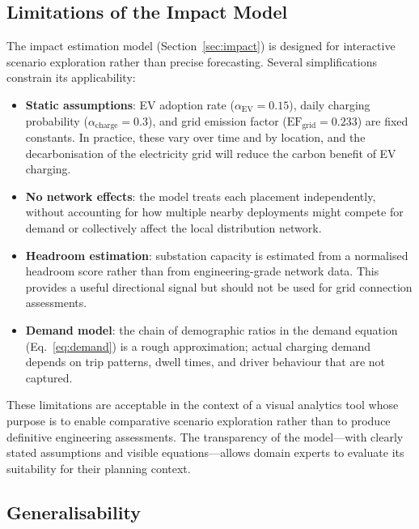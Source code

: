 \subsection{Limitations of the Impact Model}
\label{sec:disc-limitations}

The impact estimation model (Section~\ref{sec:impact}) is designed for interactive scenario exploration rather than precise forecasting. Several simplifications constrain its applicability:

\begin{itemize}[nosep]
    \item \textbf{Static assumptions}: EV adoption rate ($\alpha_{\text{EV}} = 0.15$), daily charging probability ($\alpha_{\text{charge}} = 0.3$), and grid emission factor ($\text{EF}_{\text{grid}} = 0.233$) are fixed constants. In practice, these vary over time and by location, and the decarbonisation of the electricity grid will reduce the carbon benefit of EV charging.
    \item \textbf{No network effects}: the model treats each placement independently, without accounting for how multiple nearby deployments might compete for demand or collectively affect the local distribution network.
    \item \textbf{Headroom estimation}: substation capacity is estimated from a normalised headroom score rather than from engineering-grade network data. This provides a useful directional signal but should not be used for grid connection assessments.
    \item \textbf{Demand model}: the chain of demographic ratios in the demand equation (Eq.~\ref{eq:demand}) is a rough approximation; actual charging demand depends on trip patterns, dwell times, and driver behaviour that are not captured.
\end{itemize}

\noindent These limitations are acceptable in the context of a visual analytics tool whose purpose is to enable comparative scenario exploration rather than to produce definitive engineering assessments. The transparency of the model---with clearly stated assumptions and visible equations---allows domain experts to evaluate its suitability for their planning context.

\subsection{Generalisability}
\label{sec:disc-generalisability}

